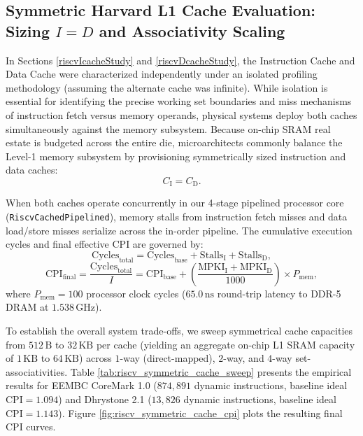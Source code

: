 \subsection{Symmetric Harvard L1 Cache Evaluation: Sizing $I = D$ and Associativity Scaling}\label{riscvSymmetricCacheStudy}

In Sections \ref{riscvIcacheStudy} and \ref{riscvDcacheStudy}, the Instruction Cache and Data Cache were characterized independently under an isolated profiling methodology (assuming the alternate cache was infinite). While isolation is essential for identifying the precise working set boundaries and miss mechanisms of instruction fetch versus memory operands, physical systems deploy both caches simultaneously against the memory subsystem. Because on-chip SRAM real estate is budgeted across the entire die, microarchitects commonly balance the Level-1 memory subsystem by provisioning symmetrically sized instruction and data caches:
\begin{equation}
C_{\text{I}} = C_{\text{D}}.
\end{equation}

When both caches operate concurrently in our 4-stage pipelined processor core (\texttt{RiscvCachedPipelined}), memory stalls from instruction fetch misses and data load/store misses serialize across the in-order pipeline. The cumulative execution cycles and final effective CPI are governed by:
\begin{equation}\label{eq:riscv_combined_cycles}
\text{Cycles}_{\text{total}} = \text{Cycles}_{\text{base}} + \text{Stalls}_{\text{I}} + \text{Stalls}_{\text{D}},
\end{equation}
\begin{equation}\label{eq:riscv_combined_cpi}
\text{CPI}_{\text{final}} = \frac{\text{Cycles}_{\text{total}}}{I} = \text{CPI}_{\text{base}} + \left(\frac{\text{MPKI}_{\text{I}} + \text{MPKI}_{\text{D}}}{1000}\right) \times P_{\text{mem}},
\end{equation}
where $P_{\text{mem}} = 100$ processor clock cycles ($65.0\,\text{ns}$ round-trip latency to DDR-5 DRAM at $1.538\,\text{GHz}$).

To establish the overall system trade-offs, we sweep symmetrical cache capacities from $512\,\text{B}$ to $32\,\text{KB}$ per cache (yielding an aggregate on-chip L1 SRAM capacity of $1\,\text{KB}$ to $64\,\text{KB}$) across $1$-way (direct-mapped), $2$-way, and $4$-way set-associativities. Table \ref{tab:riscv_symmetric_cache_sweep} presents the empirical results for EEMBC CoreMark 1.0 ($874,891$ dynamic instructions, baseline ideal $\text{CPI} = 1.094$) and Dhrystone 2.1 ($13,826$ dynamic instructions, baseline ideal $\text{CPI} = 1.143$). Figure \ref{fig:riscv_symmetric_cache_cpi} plots the resulting final CPI curves.


